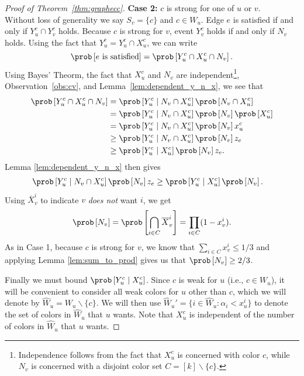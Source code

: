 \begin{proof}[Proof of Theorem~\ref{thm:graphecc}]

	\textbf{Case 2:} $c$ is strong for one of $u$ or $v$. \\
	Without loss of generality we say $S_v = \{c\}$ and $c \in W_u$. 
	Edge $e$ is satisfied if and only if $Y_u^c \cap Y_v^c$ holds. 
	Because $c$ is strong for $v$, event $Y_v^c$ holds if and only if $N_v$ holds. Using the fact that $Y_u^c = Y_u^c \cap X_u^c$, we can write
	\[
	\prob\left[e \text{ is satisfied}\right] = \prob\left[Y_u^c \cap X_u^c \cap N_v\right].
	\]
	Using Bayes' Theorm, the fact that $X_u^c$ and $N_v$ are independent\footnote{Independence follows from the fact that $X_u^c$ is concerned with color $c$, while $N_v$ is concerned with a disjoint color set $C = [k]\backslash \{c\}$.}, Observation~\ref{obs:cv}, and Lemma~\ref{lem:dependent_y_n_x}, we see that
	\begin{align*}
		\prob\left[Y_u^c \cap X_u^c \cap N_v\right] & = \prob\left[ Y_u^c \mid N_v \cap X_u^c \right] \prob\left[ N_v \cap X_u^c \right] \\
		& = \prob\left[ Y_u^c \mid N_v \cap X_u^c \right] \prob\left[ N_v \right] \prob\left[ X_u^c \right] \\
		& = \prob\left[ Y_u^c \mid N_v \cap X_u^c \right] \prob\left[ N_v \right] x_u^c \\
		& \geq \prob\left[ Y_u^c \mid N_v \cap X_u^c \right] \prob\left[ N_v \right] z_e \\
		& \geq \prob\left[ Y_u^c \mid X_u^c \right] \prob\left[ N_v \right] z_e.
	\end{align*}
	Lemma \ref{lem:dependent_y_n_x} then gives
	\begin{align*}
		\prob\left[ Y_u^c \mid N_v \cap X_u^c \right] \prob\left[ N_v \right] z_e & \geq \prob\left[ Y_u^c \mid X_u^c \right] \prob\left[ N_v \right].
	\end{align*}
	Using $\overline{X}_v^i$ to indicate $v$ \emph{does not} want $i$, we get
	\[
	\prob\left[ N_v \right] = \prob\left[ \bigcap_{i \in C} \overline{X}_v^i \right] = \prod_{i \in C}(1 - x_v^i).
	\]
	As in Case 1, because $c$ is strong for $v$, we know that $\sum_{i \in C} x_v^i \leq 1/3$ and applying Lemma \ref{lem:sum_to_prod} gives us that $\prob\left[ N_v \right] \geq 2/3$. 
	
	
	Finally we must bound $\prob\left[ Y_u^c \mid X_u^c \right]$. Since 
	$c$ is weak for $u$ (i.e., $c \in W_u$), it will be convenient to consider all weak colors for $u$ other than $c$, which we will denote by $\hat{W}_u = W_u \backslash \{c\}$. We will then use $\hat{W}_u' = \{ i \in \hat{W}_u \colon \alpha_i < x_u^i\}$ to denote the set of colors in $\hat{W}_u$ that $u$ wants. Note that $X_u^c$ is independent of the number of colors in $\hat{W}_u$ that $u$ wants. 
	

\end{proof}
